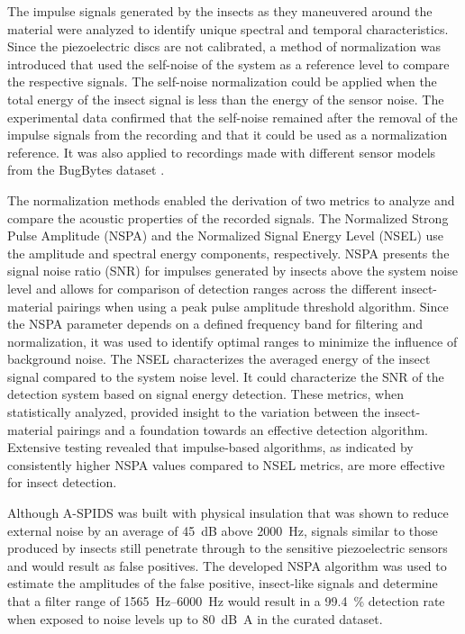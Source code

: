 \documentclass[../Vibro-Acoustic Signatures and Detection Algorithms for Stored Product Insects.tex]{subfiles}
\begin{document}
\newpage
The impulse signals generated by the insects as they maneuvered around the material were analyzed to identify unique spectral and temporal characteristics. Since the piezoelectric discs are not calibrated, a method of normalization was introduced that used the self-noise of the system as a reference level to compare the respective signals. The self-noise normalization could be applied when the total energy of the insect signal is less than the energy of the sensor noise. The experimental data confirmed that the self-noise remained after the removal of the impulse signals from the recording and that it could be used as a normalization reference. It was also applied to recordings made with different sensor models from the BugBytes dataset \cite{mankinBugBytesSound2019}.

The normalization methods enabled the derivation of two metrics to analyze and compare the acoustic properties of the recorded signals. The Normalized Strong Pulse Amplitude (NSPA) and the Normalized Signal Energy Level (NSEL) use the amplitude and spectral energy components, respectively. NSPA presents the signal noise ratio (SNR) for impulses generated by insects above the system noise level and allows for comparison of detection ranges across the different insect-material pairings when using a peak pulse amplitude threshold algorithm. Since the NSPA parameter depends on a defined frequency band for filtering and normalization, it was used to identify optimal ranges to minimize the influence of background noise. The NSEL characterizes the averaged energy of the insect signal compared to the system noise level. It could characterize the SNR of the detection system based on signal energy detection. These metrics, when statistically analyzed, provided insight to the variation between the insect-material pairings and a foundation towards an effective detection algorithm. Extensive testing revealed that impulse-based algorithms, as indicated by consistently higher NSPA values compared to NSEL metrics, are more effective for insect detection.

Although A-SPIDS was built with physical insulation that was shown to reduce external noise by an average of \SI{45}{\deci\bel} above \SI{2000}{\hertz}, signals similar to those produced by insects still penetrate through to the sensitive piezoelectric sensors and would result as false positives. The developed NSPA algorithm was used to estimate the amplitudes of the false positive, insect-like signals and determine that a filter range of \SIrange{1565}{6000}{\hertz} would result in a \SI{99.4}{\percent} detection rate when exposed to noise levels up to \SI{80}{\deci\bel A} in the curated dataset.
\end{document}
